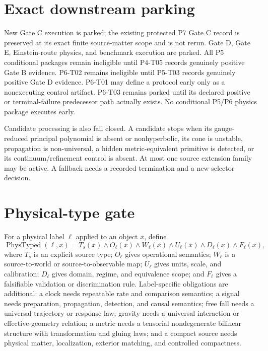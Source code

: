 \documentclass[11pt]{article}
\newcommand{\Typed}{\operatorname{PhysTyped}}
\begin{document}
\section{Exact downstream parking}

New Gate C execution is parked; the existing protected P7 Gate C record is
preserved at its exact finite source-matter scope and is not rerun. Gate D,
Gate E, Einstein-route physics, and benchmark execution are parked. All P5
conditional packages remain ineligible until P4-T05 records genuinely positive
Gate B evidence. P6-T02 remains ineligible until P5-T03 records genuinely
positive Gate D evidence. P6-T01 may define a protocol early only as a
nonexecuting control artifact. P6-T03 remains parked until its declared
positive or terminal-failure predecessor path actually exists. No conditional
P5/P6 physics package executes early.

Candidate processing is also fail closed. A candidate stops when its
gauge-reduced principal polynomial is absent or nonhyperbolic, its cone is
unstable, propagation is non-universal, a hidden metric-equivalent primitive
is detected, or its continuum/refinement control is absent. At most one source
extension family may be active. A fallback needs a recorded termination and a
new selector decision.

\section{Physical-type gate}

For a physical label $\ell$ applied to an object $x$, define
\[
 \Typed(\ell,x)=T_s(x)\wedge O_\ell(x)\wedge W_\ell(x)
 \wedge U_\ell(x)\wedge D_\ell(x)\wedge F_\ell(x),
\]
where $T_s$ is an explicit source type; $O_\ell$ gives operational semantics;
$W_\ell$ is a source-to-world or source-to-observable map; $U_\ell$ gives
units, scale, and calibration; $D_\ell$ gives domain, regime, and equivalence
scope; and $F_\ell$ gives a falsifiable validation or discrimination rule.
Label-specific obligations are additional: a clock needs repeatable rate and
comparison semantics; a signal needs preparation, propagation, detection, and
causal semantics; free fall needs a universal trajectory or response law;
gravity needs a universal interaction or effective-geometry relation; a metric
needs a tensorial nondegenerate bilinear structure with transformation and
gluing laws; and a compact source needs physical matter, localization,
exterior matching, and controlled compactness.
\end{document}
